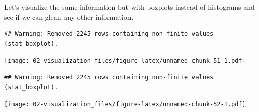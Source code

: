 \documentclass[
]{book}
\newenvironment{Shaded}{\begin{snugshade}}{\end{snugshade}}
\newcommand{\DataTypeTok}[1]{\textcolor[rgb]{0.13,0.29,0.53}{#1}}
\newcommand{\KeywordTok}[1]{\textcolor[rgb]{0.13,0.29,0.53}{\textbf{#1}}}
\newcommand{\NormalTok}[1]{#1}
\newcommand{\OperatorTok}[1]{\textcolor[rgb]{0.81,0.36,0.00}{\textbf{#1}}}
\newcommand{\StringTok}[1]{\textcolor[rgb]{0.31,0.60,0.02}{#1}}
\begin{document}
Let's visualize the same information but with boxplots instead of histograms and see if we can glean any other information.

\begin{Shaded}
\end{Shaded}

\begin{verbatim}
## Warning: Removed 2245 rows containing non-finite values (stat_boxplot).
\end{verbatim}

\texttt{[image: 02-visualization\_files/figure-latex/unnamed-chunk-51-1.pdf]}

\begin{Shaded}
\end{Shaded}

\begin{verbatim}
## Warning: Removed 2245 rows containing non-finite values (stat_boxplot).
\end{verbatim}

\texttt{[image: 02-visualization\_files/figure-latex/unnamed-chunk-52-1.pdf]}
\end{document}
